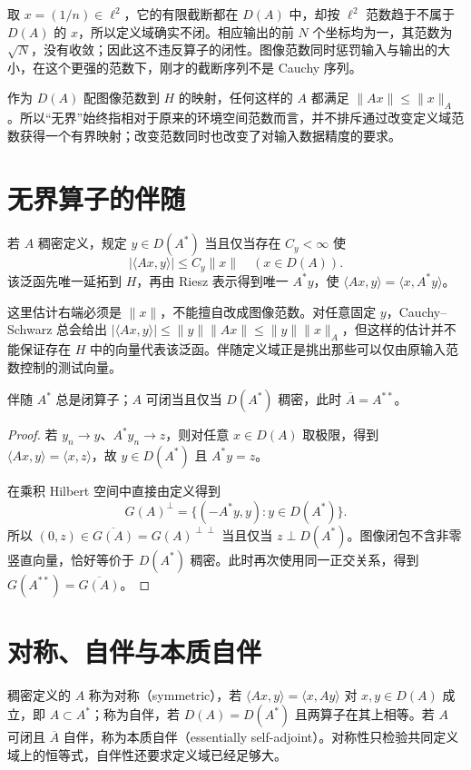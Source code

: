 取 $x=(1/n)\in\ell^2$，它的有限截断都在 $D(A)$ 中，却按 $\ell^2$ 范数趋于不属于 $D(A)$ 的 $x$，所以定义域确实不闭。相应输出的前 $N$ 个坐标均为一，其范数为 $\sqrt N$，没有收敛；因此这不违反算子的闭性。图像范数同时惩罚输入与输出的大小，在这个更强的范数下，刚才的截断序列不是 Cauchy 序列。

作为 $D(A)$ 配图像范数到 $H$ 的映射，任何这样的 $A$ 都满足 $\|Ax\|\leq\|x\|_A$。所以“无界”始终指相对于原来的环境空间范数而言，并不排斥通过改变定义域范数获得一个有界映射；改变范数同时也改变了对输入数据精度的要求。

\section{无界算子的伴随}
若 $A$ 稠密定义，规定 $y\in D(A^*)$ 当且仅当存在 $C_y<\infty$ 使
\[
 |\langle Ax,y\rangle|\leq C_y\|x\|\quad(x\in D(A)).
\]
该泛函先唯一延拓到 $H$，再由 Riesz 表示得到唯一 $A^*y$，使 $\langle Ax,y\rangle=\langle x,A^*y\rangle$。

这里估计右端必须是 $\|x\|$，不能擅自改成图像范数。对任意固定 $y$，Cauchy--Schwarz 总会给出 $|\langle Ax,y\rangle|\leq\|y\|\|Ax\|\leq\|y\|\|x\|_A$，但这样的估计并不能保证存在 $H$ 中的向量代表该泛函。伴随定义域正是挑出那些可以仅由原输入范数控制的测试向量。

\begin{proposition}
伴随 $A^*$ 总是闭算子；$A$ 可闭当且仅当 $D(A^*)$ 稠密，此时 $\overline A=A^{**}$。
\end{proposition}
\begin{proof}
若 $y_n\to y$、$A^*y_n\to z$，则对任意 $x\in D(A)$ 取极限，得到 $\langle Ax,y\rangle=\langle x,z\rangle$，故 $y\in D(A^*)$ 且 $A^*y=z$。

在乘积 Hilbert 空间中直接由定义得到
\[
 G(A)^\perp=\{(-A^*y,y):y\in D(A^*)\}.
\]
所以 $(0,z)\in\overline{G(A)}=G(A)^{\perp\perp}$ 当且仅当 $z\perp D(A^*)$。图像闭包不含非零竖直向量，恰好等价于 $D(A^*)$ 稠密。此时再次使用同一正交关系，得到 $G(A^{**})=\overline{G(A)}$。
\end{proof}

\section{对称、自伴与本质自伴}
稠密定义的 $A$ 称为对称（symmetric），若 $\langle Ax,y\rangle=\langle x,Ay\rangle$ 对 $x,y\in D(A)$ 成立，即 $A\subset A^*$；称为自伴，若 $D(A)=D(A^*)$ 且两算子在其上相等。若 $A$ 可闭且 $\overline A$ 自伴，称为本质自伴（essentially self-adjoint）。对称性只检验共同定义域上的恒等式，自伴性还要求定义域已经足够大。

